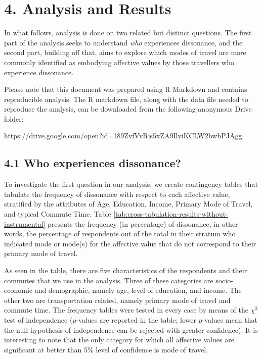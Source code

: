 \documentclass[]{elsarticle} %
\begin{document}
\hypertarget{analysis-and-results}{%
\section{4. Analysis and Results}\label{analysis-and-results}}

In what follows, analysis is done on two related but distinct questions.
The first part of the analysis seeks to understand \emph{who}
experiences dissonance, and the second part, building off that, aims to
explore which modes of travel are more commonly identified as embodying
affective values by those travellers who experience dissonance.

Please note that this document was prepared using R Markdown and
contains reproducible analysis. The R markdown file, along with the data
file needed to reproduce the analysis, can be downloaded from the
following anonymous Drive folder:

https://drive.google.com/open?id=189ZvfVvRis5xZA9IlviKCLW2bwbPJAgg

\hypertarget{who-experiences-dissonance}{%
\subsection{4.1 Who experiences
dissonance?}\label{who-experiences-dissonance}}

To investigate the first question in our analysis, we create contingency
tables that tabulate the frequency of dissonance with respect to each
affective value, stratified by the attributes of Age, Education, Income,
Primary Mode of Travel, and typical Commute Time. Table
\ref{tab:cross-tabulation-results-without-instrumental} presents the
frequency (in percentage) of dissonance, in other words, the percentage
of respondents out of the total in their stratum who indicated mode or
mode(s) for the affective value that do not correspond to their primary
mode of travel.

As seen in the table, there are five characteristics of the respondents
and their commutes that we use in the analysis. Three of these
categories are socio-economic and demographic, namely age, level of
education, and income. The other two are transportation related, namely
primary mode of travel and commute time. The frequency tables were
tested in every case by means of the \(\chi^2\) test of independence
(\(p\)-values are reported in the table; lower \(p\)-values mean that
the null hypothesis of independence can be rejected with greater
confidence). It is interesting to note that the only category for which
all affective values are significant at better than 5\% level of
confidence is mode of travel.
\end{document}
